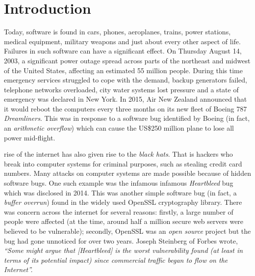 \chapter{Introduction}

Today, software is found in cars, phones, aeroplanes, trains, power stations, medical equipment, military weapons and just about every other aspect of life.  Failures in such software can have a significant effect.  On Thursday August 14, 2003, a significant power outage spread across parts of the northeast and midwest of the United States, affecting an estimated 55 million people.  During this time emergency services struggled to cope with the demand, backup generators failed, telephone networks overloaded, city water systems lost pressure and a state of emergency was declared in New York.  In 2015, Air New Zealand announced that it would reboot the computers every three months on its new fleet of Boeing 787 {\em Dreamliners}.  This was in response to a software bug identified by Boeing (in fact, an {\em arithmetic overflow}) which can cause the US\$250 million plane to lose all power mid-flight. 

 rise of the internet has also given rise to the {\em black hats}.  That is hackers who break into computer systems for criminal purposes, such as stealing credit card numbers.  Many attacks on computer systems are made possible because of hidden software bugs.  One such example was the infamous infamous {\em Heartbleed} bug which was disclosed in 2014.  This was another simple software bug (in fact, a {\em buffer overrun}) found in the widely used OpenSSL cryptography library.   There was concern across the internet for several reasons:  firstly, a large number of people were affected (at the time, around half a million secure web servers were believed to be vulnerable); secondly, OpenSSL was an {\em open source} project but the bug had gone unnoticed for over two years. Joseph Steinberg of Forbes wrote, {\em ``Some might argue that [Heartbleed] is the worst vulnerability found (at least in terms of its potential impact) since commercial traffic began to flow on the Internet''.}




